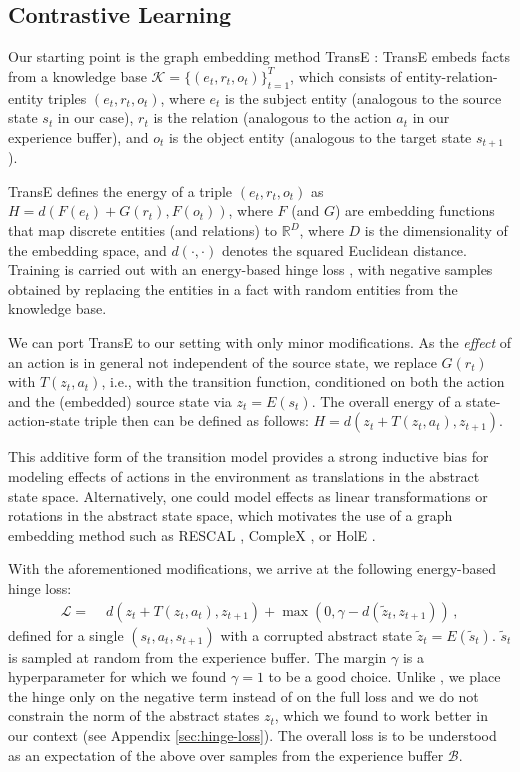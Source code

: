 \documentclass{article} %
\begin{document}
\subsection{Contrastive Learning}\label{sec:learning}
Our starting point is the graph embedding method TransE \citep{bordes2013translating}: TransE embeds facts from a knowledge base $\mathcal{K}=\{(e_t, r_t, o_{t})\}_{t=1}^T$, which consists of entity-relation-entity triples $(e_t, r_t, o_t)$, where $e_t$ is the subject entity (analogous to the source state $s_t$ in our case), $r_t$ is the relation (analogous to the action $a_t$ in our experience buffer), and $o_t$ is the object entity (analogous to the target state $s_{t+1}$).

TransE defines the energy of a triple $(e_t, r_t, o_t)$ as $H = d(F(e_t) + G(r_t), F(o_t))$, where $F$ (and $G$) are embedding functions that map discrete entities (and relations) to $\mathbb{R}^D$, where $D$ is the dimensionality of the embedding space, and $d(\cdot,\cdot)$ denotes the squared Euclidean distance. Training is carried out with an energy-based hinge loss \citep{lecun2006tutorial}, with negative samples obtained by replacing the entities in a fact with random entities from the knowledge base.

We can port TransE to our setting with only minor modifications. As the \emph{effect} of an action is in general not independent of the source state, we replace $G(r_t)$ with $T(z_t, a_t)$, i.e., with the transition function, conditioned on both the action and the (embedded) source state via $z_t = E(s_t)$. The overall energy of a state-action-state triple then can be defined as follows: $H = d(z_t + T(z_t, a_t), z_{t+1})$.

This additive form of the transition model provides a strong inductive bias for modeling effects of actions in the environment as translations in the abstract state space. Alternatively, one could model effects as linear transformations or rotations in the abstract state space, which motivates the use of a graph embedding method such as RESCAL \citep{nickel2011three}, CompleX \citep{trouillon2016complex}, or HolE \citep{nickel2016holographic}.

With the aforementioned modifications, we arrive at the following energy-based hinge loss:
\begin{align}
\mathcal{L} =\,\, &d(z_t + T(z_t, a_t), z_{t+1}) + \max(0, \gamma - d(\tilde{z}_t, z_{t+1}))\, ,
\end{align}
defined for a single $(s_t, a_t, s_{t+1})$ with a corrupted abstract state $\tilde{z}_t = E(\tilde{s}_t)$. $\tilde{s}_t$ is sampled at random from the experience buffer. The margin $\gamma$ is a hyperparameter for which we found $\gamma=1$ to be a good choice. Unlike  \citet{bordes2013translating}, we place the hinge only on the negative term instead of on the full loss and we do not constrain the norm of the abstract states $z_t$, which we found to work better in our context (see Appendix \ref{sec:hinge-loss}). The overall loss is to be understood as an expectation of the above over samples from the experience buffer $\mathcal{B}$.
\end{document}
